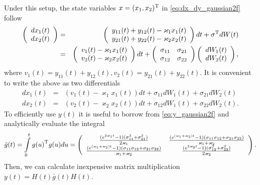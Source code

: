 \documentclass[11pt,a4paper]{article}
\numberwithin{equation}{section}
\begin{document}
Under this setup, the state variables $x = {({x_1},{x_2})^{\rm{T}}}$ in \eqref{eq:dx_dy_gaussian2f} follow 
\begin{eqnarray*}
\left( {\begin{array}{*{20}{c}}
{d{x_1}(t)}\\
{d{x_2}(t)}
\end{array}} \right) &=& \left( {\begin{array}{*{20}{c}}
{{y_{11}}(t) + {y_{12}}(t) - {\varkappa _1}{x_1}(t)}\\
{{y_{21}}(t) + {y_{22}}(t) - {\varkappa _2}{x_2}(t)}
\end{array}} \right)dt + {\sigma ^{\rm{T}}}dW(t)\\
 &=& \left( {\begin{array}{*{20}{c}}
{{v_1}(t) - {\varkappa _1}{x_1}(t)}\\
{{v_2}(t) - {\varkappa _2}{x_2}(t)}
\end{array}} \right)dt + \left( {\begin{array}{*{20}{c}}
{{\sigma _{11}}}&{{\sigma _{21}}}\\
{{\sigma _{12}}}&{{\sigma _{22}}}
\end{array}} \right)\left( {\begin{array}{*{20}{c}}
{d{W_1}(t)}\\
{d{W_2}(t)}
\end{array}} \right),
\end{eqnarray*}
where ${v_1}(t) = {y_{11}}(t) + {y_{12}}(t),{v_2}(t) = {y_{21}}(t) + {y_{22}}(t)$.
It is convenient to write the above as two differentials
\begin{eqnarray*}
d{x_1}(t) &=& \left( {{v_1}(t) - {\varkappa _1}{x_1}(t)} \right)dt + {\sigma _{11}}d{W_1}(t) + {\sigma _{21}}d{W_2}(t)\\
d{x_2}(t) &=& \left( {{v_2}(t) - {\varkappa _2}{x_2}(t)} \right)dt + {\sigma _{12}}d{W_1}(t) + {\sigma _{22}}d{W_2}(t).
\end{eqnarray*}
To efficiently use $y(t)$ it is useful to borrow from \eqref{eq:y_gaussian2f} and analytically evaluate the integral 
\begin{equation*}
\bar g(t) = \int\limits_0^t {g{{(u)}^{\rm{T}}}g(u)du}  = \left( {\begin{array}{*{20}{c}}
{\frac{{({e^{2{\varkappa_1}t}} - 1)(\sigma _{11}^2 + \sigma _{21}^2)}}{{2{\varkappa_1}}}}&{\frac{{({e^{({\varkappa_1} + {\varkappa_2})t}} - 1)({\sigma _{11}}{\sigma _{12}} + {\sigma _{21}}{\sigma _{22}})}}{{{\varkappa_1} + {\varkappa_2}}}}\\
{\frac{{({e^{({\varkappa_1} + {\varkappa_2})t}} - 1)({\sigma _{11}}{\sigma _{12}} + {\sigma _{21}}{\sigma _{22}})}}{{{\varkappa_1} + {\varkappa_2}}}}&{\frac{{({e^{2{\varkappa_2}t}} - 1)(\sigma _{12}^2 + \sigma _{22}^2)}}{{2{\varkappa_2}}}}
\end{array}} \right).
\end{equation*}
Then, we can calculate inexpensive matrix multiplication $y(t) = H(t)\bar g(t)H(t)$.
\end{document}
